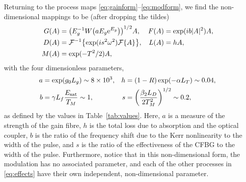 \documentclass[9pt,twocolumn,twoside]{osajnl}
\let\originalleft\left
\let\originalright\right
\renewcommand{\left}{\mathopen{}\mathclose\bgroup\originalleft}
\renewcommand{\right}{\aftergroup\egroup\originalright}
\newcommand{\Es}{E_{\textrm{sat}}} %
\newcommand{\FT}[1]{\mathcal{F}\left\{ #1 \right\}} %
\newcommand{\FTi}[1]{\mathcal{F}^{-1}\left\{ #1 \right\}} %
\begin{document}
Returning to the process maps \eqref{eq:gainform}--\eqref{eq:modform}, we find the non-dimensional mappings to be (after dropping the tildes)
\begin{align}
	G(A) &= \left(E_g^{-1} W \left( a E_g \textrm{e}^{E_g}\right) \right)^{1/2} A, & F(A) &= \exp( i b |A|^2) A, \nonumber \\
	D(A) &= \FTi{\exp( i s^2 \omega^2 ) \FT{A}}, & L(A) &= h A, \label{eq:effects} \\
	M(A) &= \exp( -T^2 / 2 ) A, \nonumber
\end{align}
with the four dimensionless parameters,
\begin{equation}
	\begin{aligned}
		a &= \exp( g_0 L_g ) \sim 8 \times 10^3, & 
		h &= (1 - R) \exp( - \alpha L_T) \sim 0.04, \\
		b &= \gamma L_f \frac{\Es}{T_M} \sim 1, & s &= \left( \frac{\beta_2 L_D}{2 T_M^2} \right)^{1/2} \sim 0.2,
		\label{eq:ndparam}
	\end{aligned}
\end{equation}
as defined by the values in Table~\ref{tab:values}. Here, $a$ is a measure of the strength of the gain fibre, $h$ is the total loss due to absorption and the optical coupler, $b$ is the ratio of the frequency shift due to the Kerr nonlinearity to the width of the pulse, and $s$ is the ratio of the effectiveness of the CFBG to the width of the pulse. Furthermore, notice that in this non-dimensional form, the modulation has no associated parameter, and each of the other processes in \eqref{eq:effects} have their own independent, non-dimensional parameter.
\end{document}
